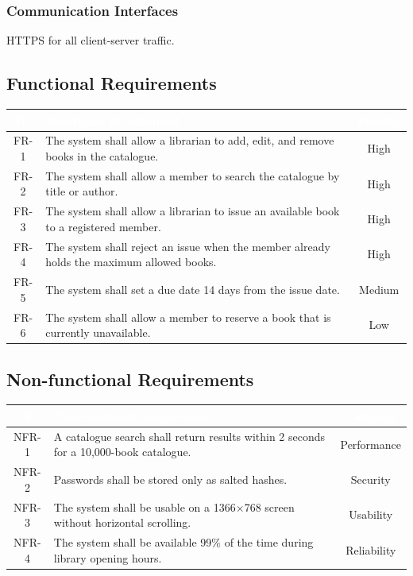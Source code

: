 \documentclass[11pt,a4paper]{article}
\newcommand{\reqheader}[3]{%
  \rowcolor{srsnavy}
  \textcolor{white}{\textbf{#1}} &
  \textcolor{white}{\textbf{#2}} &
  \textcolor{white}{\textbf{#3}} \\ \hline}
\begin{document}
\subsubsection{Communication Interfaces}
HTTPS for all client-server traffic.

\subsection{Functional Requirements}
\renewcommand{\arraystretch}{1.35}
\begin{tabularx}{\textwidth}{|c|X|c|}
\hline
\reqheader{ID}{Functional Requirement}{Priority}
FR-1 & The system shall allow a librarian to add, edit, and remove books in the catalogue. & High \\ \hline
FR-2 & The system shall allow a member to search the catalogue by title or author. & High \\ \hline
FR-3 & The system shall allow a librarian to issue an available book to a registered member. & High \\ \hline
FR-4 & The system shall reject an issue when the member already holds the maximum allowed books. & High \\ \hline
FR-5 & The system shall set a due date 14 days from the issue date. & Medium \\ \hline
FR-6 & The system shall allow a member to reserve a book that is currently unavailable. & Low \\ \hline
\end{tabularx}

\subsection{Non-functional Requirements}
\renewcommand{\arraystretch}{1.35}
\begin{tabularx}{\textwidth}{|c|X|c|}
\hline
\reqheader{ID}{Non-functional Requirement}{Category}
NFR-1 & A catalogue search shall return results within 2 seconds for a 10,000-book catalogue. & Performance \\ \hline
NFR-2 & Passwords shall be stored only as salted hashes. & Security \\ \hline
NFR-3 & The system shall be usable on a 1366$\times$768 screen without horizontal scrolling. & Usability \\ \hline
NFR-4 & The system shall be available 99\% of the time during library opening hours. & Reliability \\ \hline
\end{tabularx}
\end{document}
